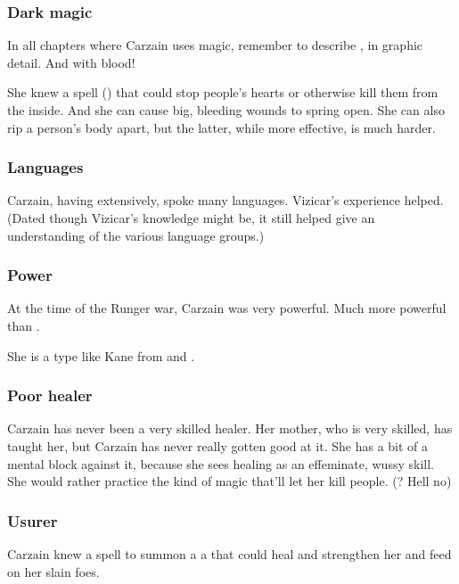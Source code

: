\subsubsection{Dark magic}
In all chapters where Carzain uses magic, remember to describe , in graphic detail. 
And with blood! 

She knew a spell (\qliphah) that could stop people's hearts or otherwise kill them from the inside. 
And she can cause big, bleeding wounds to spring open. 
She can also rip a person's body apart, but the latter, while more effective, is much harder. 





\subsubsection{Languages}
Carzain, having \travelled extensively, spoke many languages. 
Vizicar's experience helped. 
(Dated though Vizicar's knowledge might be, it still helped give an understanding of the various language groups.)





\subsubsection{Power}
At the time of the Runger war, Carzain was very powerful. 
Much more powerful than . 

She is a type like Kane from \cite{KarlEdwardWagner:GodsInDarkness} and \cite{KarlEdwardWagner:MidnightSun}. 





\subsubsection{Poor healer}
Carzain has never been a very skilled healer. 
Her mother, who is very skilled, has taught her, but Carzain has never really gotten good at it. 
She has a bit of a mental block against it, because she sees healing as an effeminate, wussy skill. 
She would rather practice the kind of magic that'll let her kill people. 
(? Hell no\prikker)





\subsubsection{Usurer}
Carzain knew a spell to summon a \dash a \daemon that could heal and strengthen her and feed on her slain foes. 





